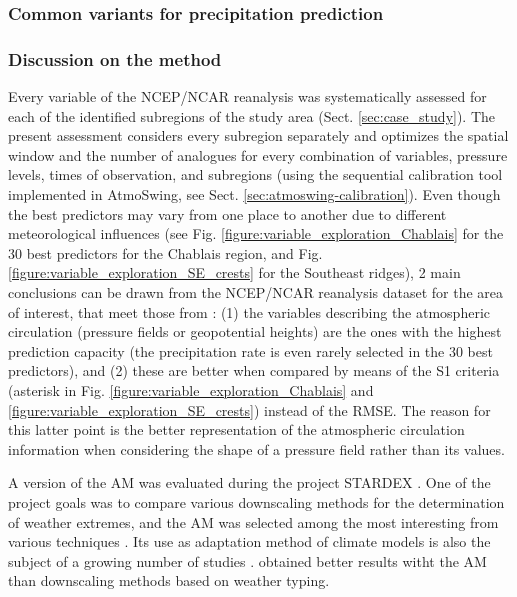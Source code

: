 \documentclass[review]{elsarticle}
\begin{document}
\subsubsection{Common variants for precipitation prediction}
\label{sec:method:references}







\subsubsection{Discussion on the method}




Every variable of the NCEP/NCAR reanalysis was systematically assessed for each of the identified subregions of the study area (Sect. \ref{sec:case_study}). The present assessment considers every subregion separately and optimizes the spatial window and the number of analogues for every combination of variables, pressure levels, times of observation, and subregions (using the sequential calibration tool implemented in AtmoSwing, see Sect. \ref{sec:atmoswing-calibration}). Even though the best predictors may vary from one place to another due to different meteorological influences (see Fig. \ref{figure:variable_exploration_Chablais} for the 30 best predictors for the Chablais region, and Fig. \ref{figure:variable_exploration_SE_crests} for the Southeast ridges), 2 main conclusions can be drawn from the NCEP/NCAR reanalysis dataset for the area of interest, that meet those from \citet{Bontron2004}: (1) the variables describing the atmospheric circulation (pressure fields or geopotential heights) are the ones with the highest prediction capacity (the precipitation rate is even rarely selected in the 30 best predictors), and (2) these are better when compared by means of the S1 criteria (asterisk in Fig. \ref{figure:variable_exploration_Chablais} and \ref{figure:variable_exploration_SE_crests}) instead of the RMSE. The reason for this latter point is the better representation of the atmospheric circulation information when considering the shape of a pressure field rather than its values.







A version of the AM was evaluated during the project STARDEX \citep[\textit{STAtistical and Regional dynamical Downscaling of EXtremes for European regions}, see][]{Goodess2003, Stardex2005}. One of the project goals was to compare various downscaling methods for the determination of weather extremes, and the AM was selected among the most interesting from various techniques \citep{Maheras2005, Schmidli2007}. Its use as adaptation method of climate models is also the subject of a growing number of studies \citep{Zorita1999, Wetterhall2005, Wetterhall2007, Matulla2007, Chardon2014, Dayon2015}. \citet{Bliefernicht2010} obtained better results witht the AM than downscaling methods based on weather typing.
\end{document}
